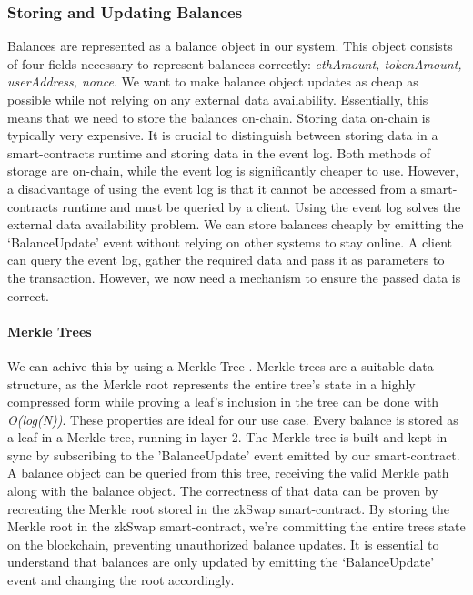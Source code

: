 \documentclass[../../thesis.tex]{subfiles}
\begin{document}
\subsubsection{Storing and Updating Balances} \label{balances}
Balances are represented as a balance object in our system. This object consists of four fields necessary to represent balances correctly: \textit{ethAmount, tokenAmount, userAddress, nonce}. We want to make balance object updates as cheap as possible while not relying on any external data availability. Essentially, this means that we need to store the balances on-chain. Storing data on-chain is typically very expensive. It is crucial to distinguish between storing data in a smart-contracts runtime and storing data in the event log. Both methods of storage are on-chain, while the event log is significantly cheaper to use. However, a disadvantage of using the event log is that it cannot be accessed from a smart-contracts runtime and must be queried by a client. Using the event log solves the external data availability problem. We can store balances cheaply by emitting the `BalanceUpdate' event without relying on other systems to stay online. A client can query the event log, gather the required data and pass it as parameters to the transaction. However, we now need a mechanism to ensure the passed data is correct.

\paragraph{Merkle Trees}
We can achive this by using a Merkle Tree \cite{szydlo2004merkle}. Merkle trees are a suitable data structure, as the Merkle root represents the entire tree's state in a highly compressed form while proving a leaf's inclusion in the tree can be done with \textit{O(log(N))}. These properties are ideal for our use case. Every balance is stored as a leaf in a Merkle tree, running in layer-2. The Merkle tree is built and kept in sync by subscribing to the 'BalanceUpdate' event emitted by our smart-contract. A balance object can be queried from this tree, receiving the valid Merkle path along with the balance object. The correctness of that data can be proven by recreating the Merkle root stored in the zkSwap smart-contract. By storing the Merkle root in the zkSwap smart-contract, we're committing the entire trees state on the blockchain, preventing unauthorized balance updates. It is essential to understand that balances are only updated by emitting the `BalanceUpdate' event and changing the root accordingly. 
\end{document}
